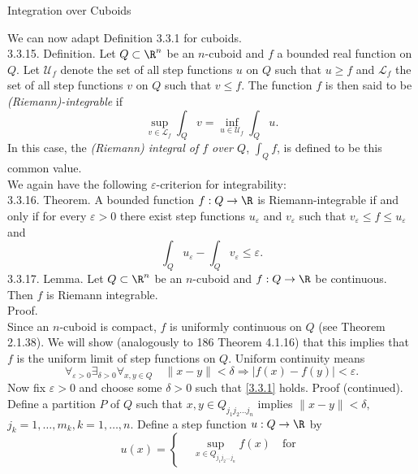 \documentclass[smaller,hyperref={CJKbookmarks=true}]{beamer}
\begin{document}
\begin{frame}{Integration over Cuboids}
\begin{spacing}{1.05}
We can now adapt Definition 3.3.1 for cuboids.\\[5pt]
\alert{3.3.15. Definition.} Let $Q\subset\R^n$ be an $n$-cuboid and $f$ a bounded real function on $Q$. Let $\mathcal{U}_f$ denote the set of all step functions $u$ on $Q$ such that $u\geq f$ and $\mathcal{L}_f$ the set of all step functions $v$ on $Q$ such that $v\leq f$. The function $f$ is then said to be \emph{(Riemann)-integrable} if
\[\sup_{v\in\mathcal{L}_f}\int_Qv=\inf_{u\in\mathcal{U}_f}
\int_Qu.\]
In this case, the \emph{(Riemann) integral of $f$ over $Q$}, $\int_Qf$, is defined to be this common value.\\[4pt]
We again have the following $\varepsilon$-criterion for integrability:\\
\alert{3.3.16. Theorem.} A bounded function $f:Q\to\R$ is Riemann-integrable if and only if for every $\varepsilon>0$ there exist step functions $u_\varepsilon$ and $v_\varepsilon$ such that $v_\varepsilon\leq f\leq u_\varepsilon$ and
\[\int_Qu_\varepsilon-\int_Qv_\varepsilon\leq\varepsilon.\]
\newpage
\vspace*{12pt}
\alert{3.3.17. Lemma.} Let $Q\subset\R^n$ be an $n$-cuboid and $f:Q\to\R$ be continuous. Then $f$ is Riemann integrable.\\[6pt]
\alert{Proof.}\\
Since an $n$-cuboid is compact, $f$ is uniformly continuous on $Q$ (see Theorem 2.1.38). We will show (analogously to 186 Theorem 4.1.16) that this implies that $f$ is the uniform limit of step functions on $Q$. Uniform continuity means
\setcounter{equation}{0}
\begin{equation}\label{3.3.1}
\mathop{\forall}_{\varepsilon>0}\mathop{\exists}_{\delta>0}
\mathop{\forall}_{x,y\in Q}\quad\|x-y\|<\delta\Rightarrow|f(x)-f(y)|<\varepsilon.
\end{equation}
Now fix $\varepsilon>0$ and choose some $\delta>0$ such that \eqref{3.3.1} holds.
\newpage
\alert{Proof (continued).}\\
Define a partition $P$ of $Q$ such that $x,y\in Q_{j_1j_2...j_n}$ implies $\|x-y\|<\delta,$\\ $j_k=1,\ldots,m_k,k=1,\ldots,n$. Define a step function $u:Q\to\R$ by
\begin{equation}\label{3.3.2}
  u(x)=\left\{\begin{aligned}
                &\sup\limits_{x\in Q_{j_1j_2...j_n}}f(x)\quad\text{for}~

\end{aligned}
\end{equation}
\end{spacing}
\end{frame}
\end{document}
